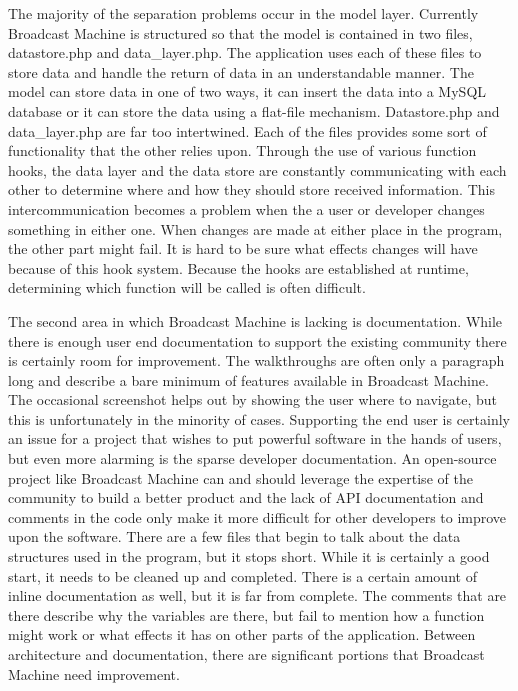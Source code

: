 \documentclass[a4paper,12pt]{report}
\begin{document}
    
The majority of the separation problems occur in the model layer. 
Currently Broadcast Machine is structured so that the model is contained in two files, datastore.php and data\_layer.php. 
The application uses each of these files to store data and handle the return of data in an understandable manner. 
The model can store data in one of two ways, it can insert the data into a MySQL database or it can store the data using a flat-file mechanism. 
Datastore.php and data\_layer.php are far too intertwined. 
Each of the files provides some sort of functionality that the other relies upon. 
Through the use of various function hooks, the data layer and the data store are constantly communicating with each other to determine where and how they should store received information. 
This intercommunication becomes a problem when the a user or developer changes something in either one. 
When changes are made at either place in the program, the other part might fail. 
It is hard to be sure what effects changes will have because of this hook system. 
Because the hooks are established at runtime, determining which function will be called is often difficult. 


The second area in which Broadcast Machine is lacking is documentation. 
While there is enough user end documentation to support the existing community there is certainly room for improvement. 
The walkthroughs are often only a paragraph long and describe a bare minimum of features available in Broadcast Machine. 
The occasional screenshot helps out by showing the user where to navigate, but this is unfortunately in the minority of cases. 
Supporting the end user is certainly an issue for a project that wishes to put powerful software in the hands of users, but even more alarming is the sparse developer documentation. 
An open-source project like Broadcast Machine can and should leverage the expertise of the community to build a better product and the lack of API documentation and comments in the code only make it more difficult for other developers to improve upon the software. 
There are a few files that begin to talk about the data structures used in the program, but it stops short. 
While it is certainly a good start, it needs to be cleaned up and completed. 
There is a certain amount of inline documentation as well, but it is far from complete. 
The comments that are there describe why the variables are there, but fail to mention how a function might work or what effects it has on other parts of the application. 
Between architecture and documentation, there are significant portions that Broadcast Machine need improvement. 
\end{document}
